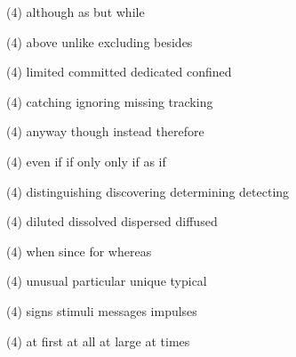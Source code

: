\item
\begin{tasks}(4)
	\task although
	\task as
	\task but
	\task while
\end{tasks}
\item
\begin{tasks}(4)
	\task above
	\task unlike
	\task excluding
	\task besides
\end{tasks}
\item
\begin{tasks}(4)
	\task limited
	\task committed
	\task dedicated
	\task confined
\end{tasks}
\item
\begin{tasks}(4)
	\task catching
	\task ignoring
	\task missing
	\task tracking
\end{tasks}
\item
\begin{tasks}(4)
	\task anyway
	\task though
	\task instead
	\task therefore
\end{tasks}
\item
\begin{tasks}(4)
	\task even if
	\task if only
	\task only if
	\task as if
\end{tasks}
\item
\begin{tasks}(4)
	\task distinguishing
	\task discovering
	\task determining
	\task detecting
\end{tasks}
\item
\begin{tasks}(4)
	\task diluted
	\task dissolved
	\task dispersed
	\task diffused
\end{tasks}
\item
\begin{tasks}(4)
	\task when
	\task since
	\task for
	\task whereas
\end{tasks}
\item
\begin{tasks}(4)
	\task unusual
	\task particular
	\task unique
	\task typical
\end{tasks}
\item
\begin{tasks}(4)
	\task signs
	\task stimuli
	\task messages
	\task impulses
\end{tasks}
\item
\begin{tasks}(4)
	\task at first
	\task at all
	\task at large
	\task at times
\end{tasks}
\item
